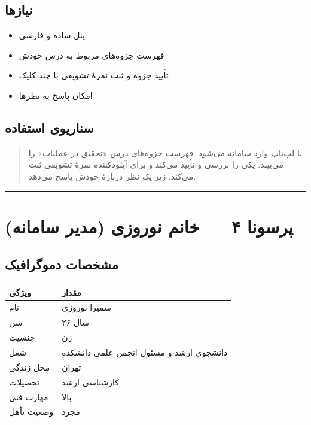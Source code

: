 \documentclass[12pt, a4paper]{article}
\begin{document}
\subsection{نیازها}

\begin{itemize}
\tightlist
\item
  پنل ساده و فارسی
\item
  فهرست جزوه‌های مربوط به درس خودش
\item
  تأیید جزوه و ثبت نمرهٔ تشویقی با چند کلیک
\item
  امکان پاسخ به نظرها
\end{itemize}

\subsection{سناریوی استفاده}

\begin{quote}
با لپ‌تاپ وارد سامانه می‌شود. فهرست جزوه‌های درس «تحقیق در عملیات» را می‌بیند.
یکی را بررسی و تأیید می‌کند و برای آپلودکننده نمرهٔ تشویقی ثبت می‌کند.
زیر یک نظر دربارهٔ خودش پاسخ می‌دهد.
\end{quote}

\begin{center}\rule{0.5\linewidth}{0.5pt}\end{center}

\section{پرسونا ۴ — خانم نوروزی (مدیر سامانه)}

\subsection{مشخصات دموگرافیک}

{\def\LTcaptype{none} %
\begin{longtable}[]{@{}ll@{}}
\toprule\noalign{}
ویژگی & مقدار \\
\midrule\noalign{}
\endhead
\bottomrule\noalign{}
\endlastfoot
نام & سمیرا نوروزی \\
سن & ۲۶ سال \\
جنسیت & زن \\
شغل & دانشجوی ارشد و مسئول انجمن علمی دانشکده \\
محل زندگی & تهران \\
تحصیلات & کارشناسی ارشد \\
مهارت فنی & بالا \\
وضعیت تأهل & مجرد \\
\end{longtable}
}
\end{document}
